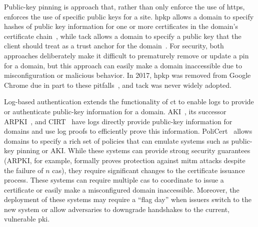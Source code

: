 Public-key pinning is  approach that, rather than only enforce the use
of \ac{https}, enforces the use of specific public keys for a site. \ac{hpkp}
allows a domain to specify hashes of public key information for one or more
certificates in the domain's certificate chain~\cite{rfc7469}, while \ac{tack}
allows a domain to specify a public key that the client should treat as a trust
anchor for the domain~\cite{marlinspike2013trust}. For security, both approaches
deliberately make it difficult to prematurely remove or update a pin for a
domain, but this approach can easily make a domain inaccessible due to
misconfiguration or malicious behavior. In 2017, \ac{hpkp} was removed from
Google Chrome due in part to these pitfalls~\cite{palmer2017intent}, and
\ac{tack} was never widely adopted.

Log-based authentication extends the functionality of \ac{ct} to enable logs to
provide or authenticate public-key information for a domain.
AKI~\cite{kim2013accountable}, its successor ARPKI~\cite{basin2014arpki}, and
CIRT~\cite{ryan2014enhanced} have logs directly provide public-key information
for domains and use log proofs to efficiently prove this information.
PoliCert~\cite{szalachowski2014policert} allows domains to specify a rich set of
policies that can emulate systems such as public-key pinning or AKI. While these
systems can provide strong security guarantees (ARPKI, for example, formally
proves protection against \ac{mitm} attacks despite the failure of $n$
\acp{ca}), they require significant changes to the certificate issuance process.
These systems can require multiple \acp{ca} to coordinate to issue a certificate
or easily make a misconfigured domain inaccessible. Moreover, the deployment of
these systems may require a ``flag day'' when issuers switch to the new system
or allow adversaries to downgrade handshakes to the current, vulnerable
\ac{pki}.

